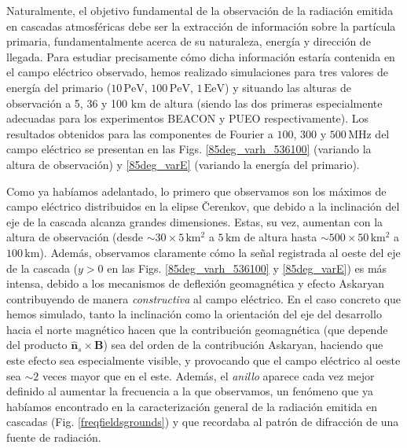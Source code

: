 \documentclass[11 pt, a4paper]{article} %
\numberwithin{equation}{section}
\numberwithin{figure}{section}
\numberwithin{table}{section}
\newcommand{\vect}[1]{\boldsymbol{\mathbf{#1}}}
\begin{document}
Naturalmente, el objetivo fundamental de la observación de la radiación emitida en cascadas atmosféricas debe ser la extracción de información sobre la partícula primaria, fundamentalmente acerca de su naturaleza, energía y dirección de llegada. Para estudiar precisamente cómo dicha información estaría contenida en el campo eléctrico observado, hemos realizado simulaciones para tres valores de energía del primario ($10\,\mathrm{PeV}$, $100\,\mathrm{PeV}$, $1\,\mathrm{EeV}$) y situando las alturas de observación a 5, 36 y 100 $\mathrm{km}$ de altura (siendo las dos primeras especialmente adecuadas para los experimentos BEACON y PUEO respectivamente). Los resultados obtenidos para las componentes de Fourier a $100$, $300$ y $500\,\mathrm{MHz}$ del campo eléctrico se presentan en las Figs. \ref{85deg_varh_536100} (variando la altura de observación)  y \ref{85deg_varE} (variando la energía del primario).

Como ya habíamos adelantado, lo primero que observamos son los máximos de campo eléctrico distribuidos en la elipse \v{C}erenkov, que debido a la inclinación del eje de la cascada alcanza grandes dimensiones. Estas, su vez, aumentan con la altura de observación (desde $\sim30\times5\,\mathrm{km^2}$ a $5\,\mathrm{km}$ de altura hasta $\sim500\times50\,\mathrm{km^2}$ a $100\,\mathrm{km}$). Además, observamos claramente cómo la señal registrada al oeste del eje de la cascada ($y>0$ en las Figs. \ref{85deg_varh_536100} y \ref{85deg_varE}) es más intensa, debido a los mecanismos de deflexión geomagnética y efecto Askaryan contribuyendo de manera \textit{constructiva} al campo eléctrico. En el caso concreto que hemos simulado, tanto la inclinación como la orientación del eje del desarrollo hacia el norte magnético hacen que la contribución geomagnética (que depende del producto $\hat{\vect{n}}_s\times\vect{B}$) sea del orden de la contribución Askaryan, haciendo que este efecto sea especialmente visible, y provocando que el campo eléctrico al oeste sea $\sim2$ veces mayor que en el este. Además, el \textit{anillo} aparece cada vez mejor definido al aumentar la frecuencia a la que observamos, un fenómeno que ya habíamos encontrado en la caracterización general de la radiación emitida en cascadas (Fig. \ref{freqfieldsgrounds}) y que recordaba al patrón de difracción de una fuente de radiación.
\end{document}
